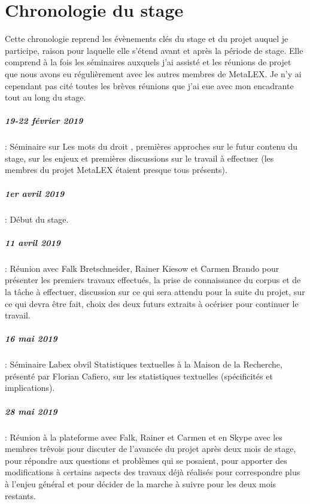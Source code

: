 \chapter{Chronologie du stage}

Cette chronologie reprend les évènements clés du stage et du projet auquel je participe, raison pour laquelle elle s'étend avant et après la période de stage. Elle comprend à la fois les séminaires auxquels j'ai assisté et les réunions de projet que nous avons eu régulièrement avec les autres membres de MetaLEX. Je n'y ai cependant pas cité toutes les brèves réunions que j'ai eue avec mon encadrante tout au long du stage.

\paragraph{19-22 février 2019} : Séminaire sur \og Les mots du droit \fg{}, premières approches sur le futur contenu du stage, sur les enjeux et premières discussions sur le travail à effectuer (les membres du projet MetaLEX étaient presque tous présents).

\paragraph{1er avril 2019} : Début du stage.

\paragraph{11 avril 2019} : Réunion avec Falk Bretschneider, Rainer Kiesow et Carmen Brando pour présenter les premiers travaux effectués, la prise de connaissance du corpus et de la tâche à effectuer, discussion sur ce qui sera attendu pour la suite du projet, sur ce qui devra être fait, choix des deux futurs extraits à océriser pour continuer le travail.

\paragraph{16 mai 2019} : Séminaire Labex \acrshort{obvil} \og Statistiques textuelles \fg{}  à la Maison de la Recherche, présenté par Florian Cafiero, sur les statistiques textuelles (spécificités et implications).

\paragraph{28 mai 2019} : Réunion à la plateforme avec Falk, Rainer et Carmen et en Skype avec les membres trêvois pour discuter de l'avancée du projet après deux mois de stage, pour répondre aux questions et problèmes qui se posaient, pour apporter des modifications à certains aspects des travaux déjà réalisés pour correspondre plus à l'enjeu général et pour décider de la marche à suivre pour les deux mois restants.

